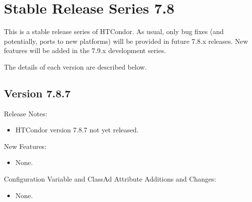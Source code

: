 
\section{\label{sec:History-7-8}Stable Release Series 7.8}

This is a stable release series of HTCondor.
As usual, only bug fixes (and potentially, ports to new platforms)
will be provided in future 7.8.x releases.
New features will be added in the 7.9.x development series.

The details of each version are described below.

\subsection*{\label{sec:New-7-8-7}Version 7.8.7}

\noindent Release Notes:

\begin{itemize}

\item HTCondor version 7.8.7 not yet released.

\end{itemize}

\noindent New Features:

\begin{itemize}

\item None.

\end{itemize}

\noindent Configuration Variable and ClassAd Attribute Additions and Changes:

\begin{itemize}

\item None.

\end{itemize}


